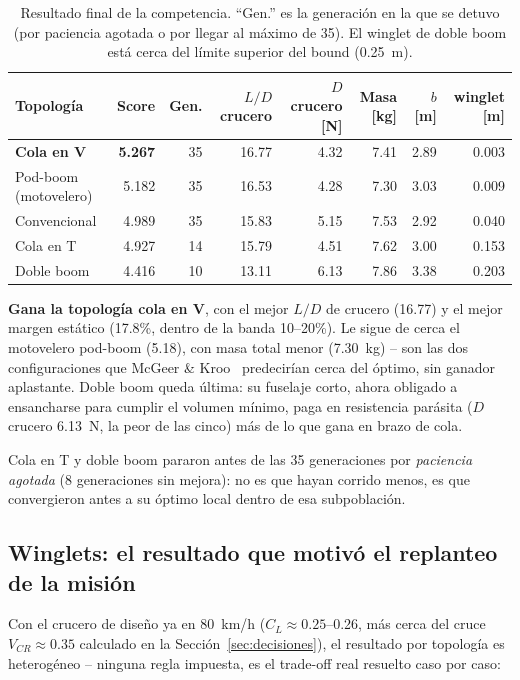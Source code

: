 \documentclass[11pt,a4paper]{article}
\begin{document}
\begin{table}[h]
\centering
\small
\begin{tabular}{@{}lrrrrrrr@{}}
\toprule
Topología & Score & Gen. & $L/D$ crucero & $D$ crucero [N] & Masa [kg] & $b$ [m] & winglet [m] \\
\midrule
\textbf{Cola en V} & \textbf{5.267} & 35 & 16.77 & 4.32 & 7.41 & 2.89 & 0.003 \\
Pod-boom (motovelero) & 5.182 & 35 & 16.53 & 4.28 & 7.30 & 3.03 & 0.009 \\
Convencional & 4.989 & 35 & 15.83 & 5.15 & 7.53 & 2.92 & 0.040 \\
Cola en T & 4.927 & 14 & 15.79 & 4.51 & 7.62 & 3.00 & 0.153 \\
Doble boom & 4.416 & 10 & 13.11 & 6.13 & 7.86 & 3.38 & 0.203 \\
\bottomrule
\end{tabular}
\caption{Resultado final de la competencia. ``Gen.'' es la generación en la que se detuvo (por paciencia agotada o por llegar al máximo de 35). El winglet de doble boom está cerca del límite superior del bound (0.25~m).}
\end{table}

\textbf{Gana la topología cola en V}, con el mejor $L/D$ de crucero (16.77) y el mejor margen estático (17.8\%, dentro de la banda 10--20\%). Le sigue de cerca el motovelero pod-boom (5.18), con masa total menor (7.30~kg) -- son las dos configuraciones que McGeer \& Kroo~\cite{mcgeer1983} predecirían cerca del óptimo, sin ganador aplastante. Doble boom queda última: su fuselaje corto, ahora obligado a ensancharse para cumplir el volumen mínimo, paga en resistencia parásita ($D$ crucero 6.13~N, la peor de las cinco) más de lo que gana en brazo de cola.

Cola en T y doble boom pararon antes de las 35 generaciones por \emph{paciencia agotada} (8 generaciones sin mejora): no es que hayan corrido menos, es que convergieron antes a su óptimo local dentro de esa subpoblación.

\subsection{Winglets: el resultado que motivó el replanteo de la misión}

Con el crucero de diseño ya en 80~km/h ($C_L\approx0.25$--0.26, más cerca del cruce $V_{CR}\approx0.35$ calculado en la Sección~\ref{sec:decisiones}), el resultado por topología es heterogéneo -- ninguna regla impuesta, es el trade-off real resuelto caso por caso:
\end{document}
